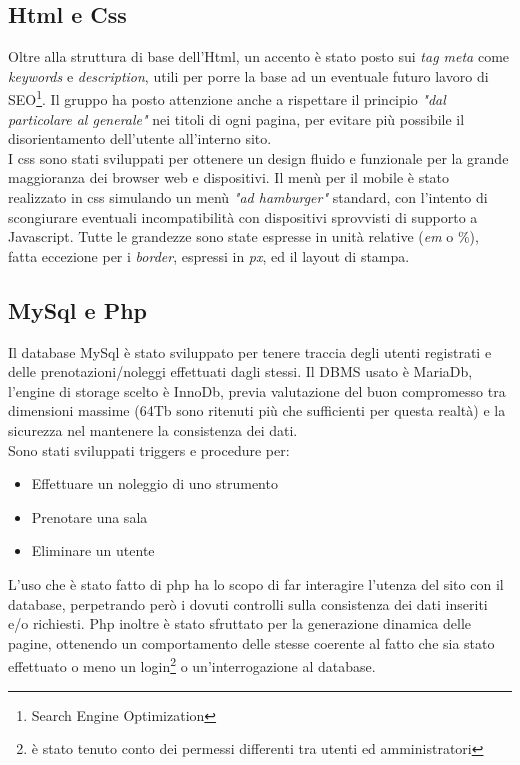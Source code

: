 \subsection{Html e Css}
Oltre alla struttura di base dell'Html, un accento è stato posto sui \emph{tag meta} come \emph{keywords} e \emph{description}, utili per porre la base ad un eventuale futuro lavoro di SEO\footnote{Search Engine Optimization}. Il gruppo ha posto attenzione anche a rispettare il principio \emph{"dal particolare al generale"} nei titoli di ogni pagina, per evitare più possibile il disorientamento dell'utente all'interno sito.\\
I css sono stati sviluppati per ottenere un design fluido e funzionale per la grande maggioranza dei browser web e dispositivi. Il menù per il mobile è stato realizzato in css simulando un menù \emph{"ad hamburger"} standard, con l'intento di scongiurare eventuali incompatibilità con dispositivi sprovvisti di supporto a Javascript. Tutte le grandezze sono state espresse in unità relative (\emph{em} o \%), fatta eccezione per i \emph{border}, espressi in \emph{px}, ed il layout di stampa.


\subsection{MySql e Php}
Il database MySql è stato sviluppato per tenere traccia degli utenti registrati e delle prenotazioni/noleggi effettuati dagli stessi. Il DBMS usato è MariaDb, l'engine di storage scelto è InnoDb, previa valutazione del buon compromesso tra dimensioni massime (64Tb sono ritenuti più che sufficienti per questa realtà) e la sicurezza nel mantenere la consistenza dei dati.\\
Sono stati sviluppati triggers e procedure per:
\begin{itemize}
\item Effettuare un noleggio di uno strumento
\item Prenotare una sala
\item Eliminare un utente
\end{itemize}
L'uso che è stato fatto di php ha lo scopo di far interagire l'utenza del sito con il database, perpetrando però i dovuti controlli sulla consistenza dei dati inseriti e/o richiesti. Php inoltre è stato sfruttato per la generazione dinamica delle pagine, ottenendo un comportamento delle stesse coerente al fatto che sia stato effettuato o meno un login\footnote{è stato tenuto conto dei permessi differenti tra utenti ed amministratori} o un'interrogazione al database.

